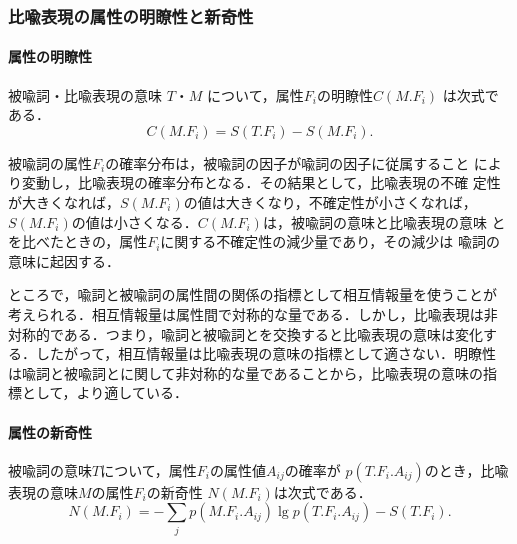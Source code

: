 \subsubsection{比喩表現の属性の明瞭性と新奇性}

\paragraph{属性の明瞭性}

被喩詞・比喩表現の意味 $T$・$M$ について，属性$F_i$の明瞭性$C(M.F_i)$
は次式である．
\begin{equation}
  \label{eq:clarity}
  C(M.F_i) = S(T.F_i) - S(M.F_i).
\end{equation}

被喩詞の属性\hspace{-0.1mm}$F_i$\hspace{-0.1mm}の確率分布は，\hspace{-0.2mm}被喩詞の因子が喩詞の因子に従属すること
により変動し，比喩表現の確率分布となる．その結果として，比喩表現の不確
定性が大きくなれば，$S(M.F_i)$の値は大きくなり，不確定性が小さくなれば，
$S(M.F_i)$の値は小さくなる．$C(M.F_i)$は，被喩詞の意味と比喩表現の意味
とを比べたときの，属性$F_i$に関する不確定性の減少量であり，その減少は
喩詞の意味に起因する．

ところで，喩詞と被喩詞の属性間の関係の指標として相互情報量を使うことが
考えられる．相互情報量は属性間で対称的な量である．しかし，比喩表現は非
対称的である．つまり，喩詞と被喩詞とを交換すると比喩表現の意味は変化す
る．したがって，相互情報量は比喩表現の意味の指標として適さない．明瞭性
は喩詞と被喩詞とに関して非対称的な量であることから，比喩表現の意味の指
標として，より適している\cite{Utiyama95a}．

\paragraph{属性の新奇性}
被喩詞の意味$T$\hspace{-0.1mm}について，\hspace{-0.2mm}属性$F_i$\hspace{-0.1mm}の属性値$A_{ij}$\hspace{-0.1mm}の確率が
$p(T.F_i.A_{ij})$のとき，比喩表現の意味$M$の属性$F_i$の新奇性
$N(M.F_i)$は次式である．
\begin{equation}
  \label{eq:novelty}
  N(M.F_i) = - \sum_{j} p(M.F_i.A_{ij}) \lg p(T.F_i.A_{ij}) - S(T.F_i).
\end{equation}

